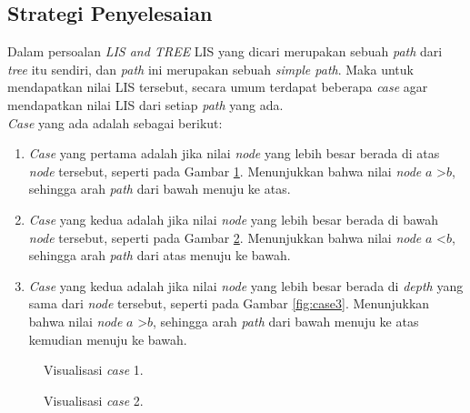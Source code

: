 \documentclass[a4paper]{IEEEtran}
\begin{document}
\subsection{Strategi Penyelesaian}
Dalam persoalan \textit{LIS and TREE} LIS yang dicari merupakan sebuah \textit{path} dari \textit{tree} itu sendiri, dan \textit{path} ini merupakan sebuah \textit{simple path}. Maka untuk mendapatkan nilai LIS tersebut, secara umum terdapat beberapa \textit{case} agar mendapatkan nilai LIS dari setiap \textit{path} yang ada.\\
\textit{Case} yang ada adalah sebagai berikut:
\begin{enumerate}
	\item \textit{Case} yang pertama adalah jika nilai \textit{node} yang lebih besar berada di atas \textit{node} tersebut, seperti pada Gambar \ref{fig:case1}. Menunjukkan bahwa nilai \textit{node} $a$ \textgreater $b$, sehingga arah \textit{path} dari bawah menuju ke atas.
	\item \textit{Case} yang kedua adalah jika nilai \textit{node} yang lebih besar berada di bawah \textit{node} tersebut, seperti pada Gambar \ref{fig:case2}. Menunjukkan bahwa nilai \textit{node} $a$ \textless $b$, sehingga arah \textit{path} dari atas menuju ke bawah.
	\item \textit{Case} yang kedua adalah jika nilai \textit{node} yang lebih besar berada di \textit{depth} yang sama dari \textit{node} tersebut, seperti pada Gambar \ref{fig:case3}. Menunjukkan bahwa nilai \textit{node} $a$ \textgreater $b$, sehingga arah \textit{path} dari bawah menuju ke atas kemudian menuju ke bawah.
\end{enumerate} 
\begin{figure}[H]
	\centering
	\caption{Visualisasi \textit{case} 1.\label{fig:case1}}
\end{figure}
\begin{figure}[H]
	\centering
	\caption{Visualisasi \textit{case} 2.\label{fig:case2}}
\end{figure}
\end{document}
